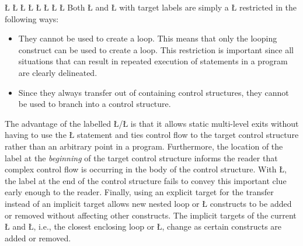 \documentclass[openright,twoside]{report}
\begin{document}
\L{\LB{}}
\CE{}\L{\LB{}}
\CE{}\L{\LB{}}
\CE{}\L{\LB{}}
\L{\LB{}}
\L{\LB{}}
\L{\LB{}}
\L{\LB{\}}}
\endlgrinde\LGend
Both \LGinlinetrue\LGbegin\lgrinde\L{}\endlgrinde\LGend{} and \LGinlinetrue\LGbegin\lgrinde\L{}\endlgrinde\LGend{} with target labels are simply a \LGinlinetrue\LGbegin\lgrinde\L{}\endlgrinde\LGend{} restricted in the following ways: 
\begin{itemize}
\item
They cannot be used to create a loop.
This means that only the looping construct can be used to create a loop.
This restriction is important since all situations that can result in repeated execution of statements in a program are clearly delineated.
\item
Since they always transfer out of containing control structures, they cannot be used to branch into a control structure.
\end{itemize}

The advantage of the labelled \LGinlinetrue\LGbegin\lgrinde\L{}\endlgrinde\LGend{}/\LGinlinetrue\LGbegin\lgrinde\L{}\endlgrinde\LGend{} is that it allows static multi-level exits without having to use the \LGinlinetrue\LGbegin\lgrinde\L{}\endlgrinde\LGend{} statement and ties control flow to the target control structure rather than an arbitrary point in a program.
Furthermore, the location of the label at the \emph{beginning} of the target control structure informs the reader that complex control flow is occurring in the body of the control structure.
With \LGinlinetrue\LGbegin\lgrinde\L{}\endlgrinde\LGend{}, the label at the end of the control structure fails to convey this important clue early enough to the reader.
Finally, using an explicit target for the transfer instead of an implicit target allows new nested loop or \LGinlinetrue\LGbegin\lgrinde\L{}\endlgrinde\LGend{} constructs to be added or removed without affecting other constructs.
The implicit targets of the current \LGinlinetrue\LGbegin\lgrinde\L{}\endlgrinde\LGend{} and \LGinlinetrue\LGbegin\lgrinde\L{}\endlgrinde\LGend{}, i.e., the closest enclosing loop or \LGinlinetrue\LGbegin\lgrinde\L{}\endlgrinde\LGend{}, change as certain constructs are added or removed.
\end{document}
